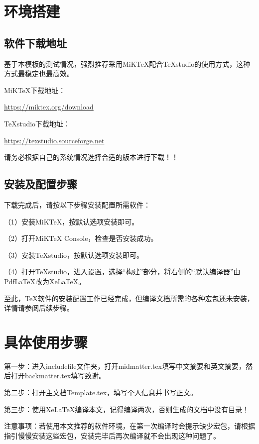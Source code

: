 \documentclass{GZHUMaster}
\begin{document}
\section{环境搭建}
\subsection{软件下载地址}
基于本模板的测试情况，强烈推荐采用MiKTeX配合TeXstudio的使用方式，这种方式最稳定也最高效。\par
MiKTeX下载地址：\par
\url{https://miktex.org/download}\par
TeXstudio下载地址：\par
\url{https://texstudio.sourceforge.net}\par
请务必根据自己的系统情况选择合适的版本进行下载！！\par
\subsection{安装及配置步骤}
下载完成后，请按以下步骤安装配置所需软件：\par
（1）安装MiKTeX，按默认选项安装即可。\par
（2）打开MiKTeX Console，检查是否安装成功。\par
（3）安装TeXstudio，按默认选项安装即可。\par
（4）打开TeXstudio，进入设置，选择“构建”部分，将右侧的“默认编译器”由PdfLaTeX改为XeLaTeX。\par
至此，TeX软件的安装配置工作已经完成，但编译文档所需的各种宏包还未安装，详情请参阅后续步骤。
\section{具体使用步骤}
第一步：进入includefile文件夹，打开midmatter.tex填写中文摘要和英文摘要，然后打开backmatter.tex填写致谢。\par
第二步：打开主文档Template.tex，填写个人信息并书写正文。\par
第三步：使用XeLaTeX编译本文，记得编译两次，否则生成的文档中没有目录！\par
注意事项：若使用本文推荐的软件环境，在第一次编译时会提示缺少宏包，请根据指引慢慢安装这些宏包，安装完毕后再次编译就不会出现这种问题了。
\end{document}
